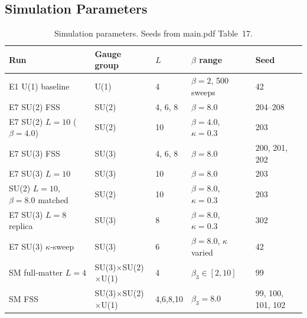
\subsection{Simulation Parameters}

\begin{table}[htbp]
\caption{Simulation parameters. Seeds from main.pdf Table~17.}
\label{tab:sim-params}
\begin{tabular}{lllll}
Run & Gauge group & $L$ & $\beta$ range & Seed \\
\hline
E1 U(1) baseline
  & U(1) & 4 & $\beta=2$, 500 sweeps & 42 \\
E7 SU(2) FSS
  & SU(2) & 4, 6, 8 & $\beta=8.0$ & 204--208 \\
E7 SU(2) $L=10$ ($\beta{=}4.0$)
  & SU(2) & 10 & $\beta=4.0$, $\kappa=0.3$ & 203 \\
E7 SU(3) FSS
  & SU(3) & 4, 6, 8 & $\beta=8.0$ & 200, 201, 202 \\
E7 SU(3) $L=10$
  & SU(3) & 10 & $\beta=8.0$ & 203 \\
SU(2) $L=10$, $\beta{=}8.0$ matched
  & SU(2) & 10 & $\beta=8.0$, $\kappa=0.3$ & 203 \\
E7 SU(3) $L=8$ replica
  & SU(3) & 8 & $\beta=8.0$, $\kappa=0.3$ & 302 \\
E7 SU(3) $\kappa$-sweep
  & SU(3) & 6 & $\beta=8.0$, $\kappa$ varied & 42 \\
SM full-matter $L=4$
  & SU(3)$\times$SU(2)$\times$U(1) & 4 & $\beta_3\in[2,10]$ & 99 \\
SM FSS
  & SU(3)$\times$SU(2)$\times$U(1) & 4,6,8,10 & $\beta_3=8.0$ & 99, 100, 101, 102 \\
\end{tabular}
\end{table}


